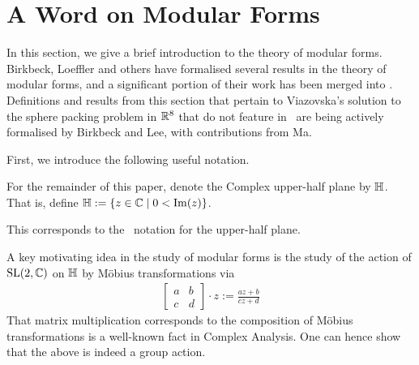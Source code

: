 \section{A Word on Modular Forms}
\label{Ch2:Sec:ModForms}

\begin{comment}
Things to discuss:
1. What is a modular form
2. What is a quasimodular form
3. Examples: Eisenstein Series, Jacobi Theta functions, Discriminant form
We can reference things like the q-expansions of the Eisenstein series, the transformation rules for the Jacobi theta functions, and the product formula for the discriminant form.
\end{comment}

In this section, we give a brief introduction to the theory of modular forms. Birkbeck, Loeffler and others have formalised several results in the theory of modular forms, and a significant portion of their work has been merged into \mathlib. Definitions and results from this section that pertain to Viazovska's solution to the sphere packing problem in $\mathbb{R}^8$ that do not feature in \mathlib\ are being actively formalised by Birkbeck and Lee, with contributions from Ma.

First, we introduce the following useful notation.

\begin{boxnotation}
    For the remainder of this paper, denote the Complex upper-half plane by $\mathbb{H}$. That is, define $\mathbb{H} := \left\{ z \in \mathbb{C} \; \middle\vert \; 0 < \operatorname{Im}(z) \right\}$.
\end{boxnotation}

This corresponds to the \mathlib\ notation for the upper-half plane.

A key motivating idea in the study of modular forms is the study of the action of $\operatorname{SL}\!\left( 2, \mathbb{C} \right)$ on $\mathbb{H}$ by Möbius transformations via
\begin{align*}
    \begin{bmatrix}
        a & b \\ c & d
    \end{bmatrix}
    \cdot z := \frac{az + b}{cz + d}
\end{align*}
That matrix multiplication corresponds to the composition of Möbius transformations is a well-known fact in Complex Analysis. One can hence show that the above is indeed a group action.



